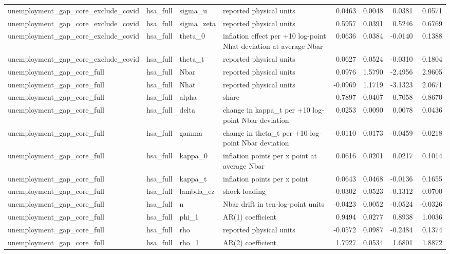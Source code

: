 \begin{tabular}{llllrrrr}
unemployment\_gap\_core\_exclude\_covid & hsa\_full & sigma\_u & reported physical units & 0.0463 & 0.0048 & 0.0381 & 0.0571 \\
unemployment\_gap\_core\_exclude\_covid & hsa\_full & sigma\_zeta & reported physical units & 0.5957 & 0.0391 & 0.5246 & 0.6769 \\
unemployment\_gap\_core\_exclude\_covid & hsa\_full & theta\_0 & inflation effect per +10 log-point Nhat deviation at average Nbar & 0.0636 & 0.0384 & -0.0140 & 0.1388 \\
unemployment\_gap\_core\_exclude\_covid & hsa\_full & theta\_t & reported physical units & 0.0627 & 0.0524 & -0.0310 & 0.1804 \\
unemployment\_gap\_core\_full & hsa\_full & Nbar & reported physical units & 0.0976 & 1.5790 & -2.4956 & 2.9605 \\
unemployment\_gap\_core\_full & hsa\_full & Nhat & reported physical units & -0.0969 & 1.1719 & -3.1323 & 2.0671 \\
unemployment\_gap\_core\_full & hsa\_full & alpha & share & 0.7897 & 0.0407 & 0.7058 & 0.8670 \\
unemployment\_gap\_core\_full & hsa\_full & delta & change in kappa\_t per +10 log-point Nbar deviation & 0.0253 & 0.0090 & 0.0078 & 0.0436 \\
unemployment\_gap\_core\_full & hsa\_full & gamma & change in theta\_t per +10 log-point Nbar deviation & -0.0110 & 0.0173 & -0.0459 & 0.0218 \\
unemployment\_gap\_core\_full & hsa\_full & kappa\_0 & inflation points per x point at average Nbar & 0.0616 & 0.0201 & 0.0217 & 0.1014 \\
unemployment\_gap\_core\_full & hsa\_full & kappa\_t & inflation points per x point & 0.0643 & 0.0468 & -0.0136 & 0.1655 \\
unemployment\_gap\_core\_full & hsa\_full & lambda\_ez & shock loading & -0.0302 & 0.0523 & -0.1312 & 0.0700 \\
unemployment\_gap\_core\_full & hsa\_full & n & Nbar drift in ten-log-point units & -0.0423 & 0.0052 & -0.0524 & -0.0326 \\
unemployment\_gap\_core\_full & hsa\_full & phi\_1 & AR(1) coefficient & 0.9494 & 0.0277 & 0.8938 & 1.0036 \\
unemployment\_gap\_core\_full & hsa\_full & rho & reported physical units & -0.0572 & 0.0987 & -0.2484 & 0.1374 \\
unemployment\_gap\_core\_full & hsa\_full & rho\_1 & AR(2) coefficient & 1.7927 & 0.0534 & 1.6801 & 1.8872 \\

\end{tabular}
